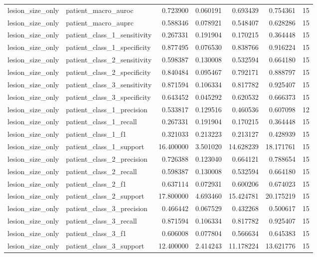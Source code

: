 \begin{tabular}{llrrrrr}
lesion_size_only & patient_macro_auroc & 0.723900 & 0.060191 & 0.693439 & 0.754361 & 15 \\
lesion_size_only & patient_macro_auprc & 0.588346 & 0.078921 & 0.548407 & 0.628286 & 15 \\
lesion_size_only & patient_class_1_sensitivity & 0.267331 & 0.191904 & 0.170215 & 0.364448 & 15 \\
lesion_size_only & patient_class_1_specificity & 0.877495 & 0.076530 & 0.838766 & 0.916224 & 15 \\
lesion_size_only & patient_class_2_sensitivity & 0.598387 & 0.130008 & 0.532594 & 0.664180 & 15 \\
lesion_size_only & patient_class_2_specificity & 0.840484 & 0.095467 & 0.792171 & 0.888797 & 15 \\
lesion_size_only & patient_class_3_sensitivity & 0.871594 & 0.106334 & 0.817782 & 0.925407 & 15 \\
lesion_size_only & patient_class_3_specificity & 0.643452 & 0.045292 & 0.620532 & 0.666373 & 15 \\
lesion_size_only & patient_class_1_precision & 0.533817 & 0.129516 & 0.460536 & 0.607098 & 12 \\
lesion_size_only & patient_class_1_recall & 0.267331 & 0.191904 & 0.170215 & 0.364448 & 15 \\
lesion_size_only & patient_class_1_f1 & 0.321033 & 0.213223 & 0.213127 & 0.428939 & 15 \\
lesion_size_only & patient_class_1_support & 16.400000 & 3.501020 & 14.628239 & 18.171761 & 15 \\
lesion_size_only & patient_class_2_precision & 0.726388 & 0.123040 & 0.664121 & 0.788654 & 15 \\
lesion_size_only & patient_class_2_recall & 0.598387 & 0.130008 & 0.532594 & 0.664180 & 15 \\
lesion_size_only & patient_class_2_f1 & 0.637114 & 0.072931 & 0.600206 & 0.674023 & 15 \\
lesion_size_only & patient_class_2_support & 17.800000 & 4.693460 & 15.424781 & 20.175219 & 15 \\
lesion_size_only & patient_class_3_precision & 0.466442 & 0.067529 & 0.432268 & 0.500617 & 15 \\
lesion_size_only & patient_class_3_recall & 0.871594 & 0.106334 & 0.817782 & 0.925407 & 15 \\
lesion_size_only & patient_class_3_f1 & 0.606008 & 0.077804 & 0.566634 & 0.645383 & 15 \\
lesion_size_only & patient_class_3_support & 12.400000 & 2.414243 & 11.178224 & 13.621776 & 15 \\

\end{tabular}
